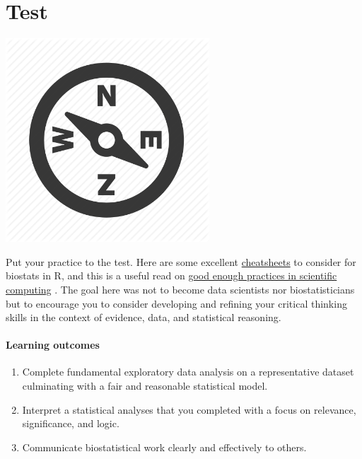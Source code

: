 \documentclass[
]{book}
\providecommand{\tightlist}{%
  \setlength{\itemsep}{0pt}\setlength{\parskip}{0pt}}
\begin{document}
\hypertarget{test}{%
\chapter{Test}\label{test}}

\includegraphics[width=3in,height=\textheight]{./test.png}

Put your practice to the test. Here are some excellent \href{https://www.rstudio.com/resources/cheatsheets/}{cheatsheets} to consider for biostats in R, and this is a useful read on \href{https://arxiv.org/abs/1609.00037}{good enough practices in scientific computing} \citep{RN5002}. The goal here was not to become data scientists nor biostatisticians but to encourage you to consider developing and refining your critical thinking skills in the context of evidence, data, and statistical reasoning.

\hypertarget{learning-outcomes-6}{%
\subsubsection*{Learning outcomes}\label{learning-outcomes-6}}

\begin{enumerate}
\def\labelenumi{\arabic{enumi}.}
\tightlist
\item
  Complete fundamental exploratory data analysis on a representative dataset culminating with a fair and reasonable statistical model.\\
\item
  Interpret a statistical analyses that you completed with a focus on relevance, significance, and logic.\\
\item
  Communicate biostatistical work clearly and effectively to others.
\end{enumerate}
\end{document}
